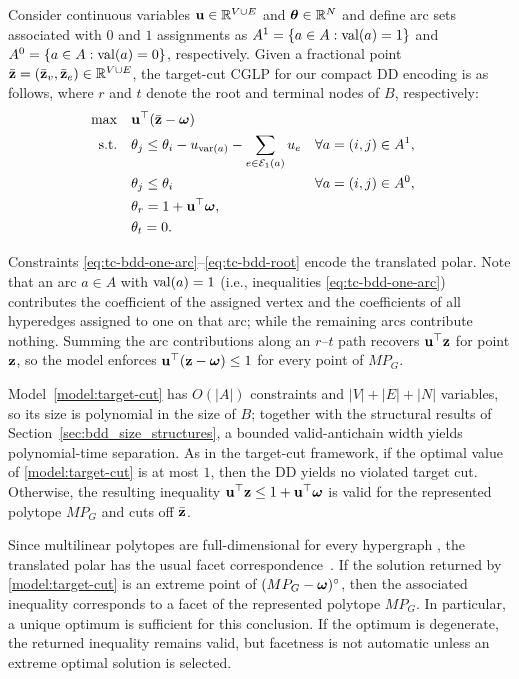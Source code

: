Consider continuous variables $\mathbf{u}\in\mathbb{R}^{V\cup E}$ and $\bm{\theta}\in\mathbb{R}^N$ and define arc sets associated with $0$ and $1$ assignments as $A^1=\{a\in A:\operatorname{val}(a)=1\}$ and $
A^0=\{a\in A:\operatorname{val}(a)=0\}$, respectively. Given a fractional point $\bar {\mathbf{z}}=(\bar {\mathbf{z}}_v,\bar {\mathbf{z}}_e)\in\mathbb{R}^{V\cup E}$, the target-cut CGLP for our compact DD encoding is as follows, where $r$ and $t$ denote the root and terminal nodes of $B$, respectively:
%
\begin{subequations}\label{model:target-cut}
\begin{align}
\max \quad & \mathbf{u}^\top(\bar {\mathbf{z}}-\bm{\omega})\\
\text{s.t.}\quad
& \theta_j
\le \theta_i
- u_{\operatorname{var}(a)}
- \sum_{e\in\mathcal{E}_1(a)} u_e
&& \forall a=(i,j)\in A^1,
\label{eq:tc-bdd-one-arc}\\
& \theta_j \le \theta_i
&& \forall a=(i,j)\in A^0,
\label{eq:tc-bdd-zero-arc}\\
& \theta_r = 1 + \mathbf{u}^\top\bm{\omega},
&&
\label{eq:tc-bdd-root}\\
& \theta_t = 0.
&&
\label{eq:tc-bdd-terminal}
\end{align}
\end{subequations}

Constraints \eqref{eq:tc-bdd-one-arc}--\eqref{eq:tc-bdd-root} encode the translated
polar. Note that an arc $a\in A$ with $\operatorname{val}(a)=1$ (i.e., inequalities \eqref{eq:tc-bdd-one-arc}) contributes the coefficient of the assigned vertex and the coefficients of all hyperedges assigned to one on that arc; while the remaining arcs contribute nothing. %
Summing the arc contributions along an $r$--$t$ path recovers $\mathbf{u}^\top \mathbf{z}$ for point $\mathbf{z}$, so the model enforces $\mathbf{u}^\top(\mathbf{z}-\bm{\omega})\le 1$ for every point of $MP_G$.

Model~\eqref{model:target-cut} has $O(|A|)$ constraints and $|V|+|E|+|N|$ variables, so its size is polynomial in the size of $B$; together with the structural results of Section~\ref{sec:bdd_size_structures}, a bounded valid-antichain width yields polynomial-time separation. As in the target-cut framework, if the optimal value of \eqref{model:target-cut} is at most $1$, then the DD yields no violated target cut. Otherwise, the resulting inequality $ \mathbf{u}^\top \mathbf{z} \le 1 + \mathbf{u}^\top\bm{\omega} $ is valid for the represented polytope $MP_G$ and cuts off $\bar{\mathbf{z}}$.

Since multilinear polytopes are full-dimensional for every hypergraph \cite{del2017polyhedral}, the translated polar has the usual facet correspondence~\cite{buchheimLiersOswald2008localcuts}. If the solution returned by \eqref{model:target-cut} is an extreme point of $(MP_G-\bm{\omega})^\circ$, then the associated inequality corresponds to a facet of the represented polytope $MP_G$. In particular, a unique optimum is sufficient for this conclusion. If the optimum is degenerate, the returned inequality remains valid, but facetness is not automatic unless an extreme optimal solution is selected.